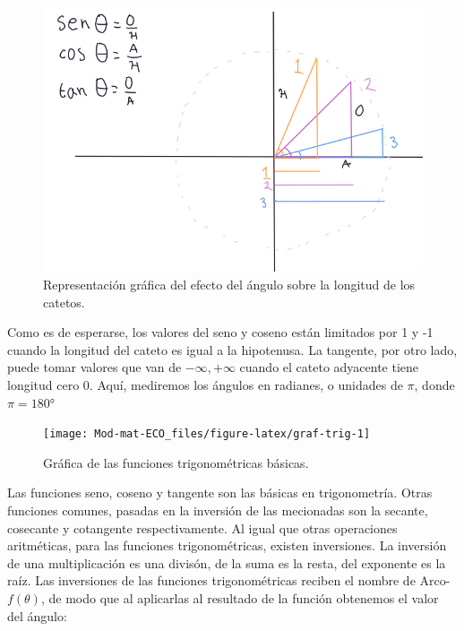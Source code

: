 \documentclass[
]{book}
\begin{document}
\begin{figure}

{\centering \includegraphics[width=9.53in]{Unidad-II/Func-trigo} 

}

\caption{Representación gráfica del efecto del ángulo sobre la longitud de los catetos.}\label{fig:catetos}
\end{figure}

Como es de esperarse, los valores del seno y coseno están limitados por 1 y -1 cuando la longitud del cateto es igual a la hipotenusa. La tangente, por otro lado, puede tomar valores que van de \(-\infty, +\infty\) cuando el cateto adyacente tiene longitud cero \(0\). Aquí, mediremos los ángulos en radianes, o unidades de \(\pi\), donde \(\pi = 180°\)

\begin{figure}

{\centering \texttt{[image: Mod-mat-ECO\_files/figure-latex/graf-trig-1]} 

}

\caption{Gráfica de las funciones trigonométricas básicas.}\label{fig:graf-trig}
\end{figure}

Las funciones seno, coseno y tangente son las básicas en trigonometría. Otras funciones comunes, pasadas en la inversión de las mecionadas son la secante, cosecante y cotangente respectivamente. Al igual que otras operaciones aritméticas, para las funciones trigonométricas, existen inversiones. La inversión de una multiplicación es una divisón, de la suma es la resta, del exponente es la raíz. Las inversiones de las funciones trigonométricas reciben el nombre de Arco-\(f(\theta)\), de modo que al aplicarlas al resultado de la función obtenemos el valor del ángulo:
\end{document}
